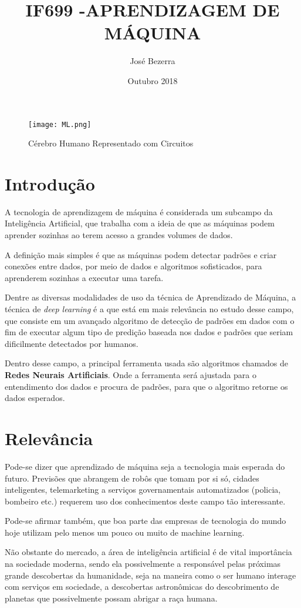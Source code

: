 \documentclass[10pt]{article}
\title{IF699 -APRENDIZAGEM DE MÁQUINA}
\author{José Bezerra}
\date{Outubro 2018}
\begin{document}
\maketitle

\begin{figure}[h!]
\centering
\texttt{[image: ML.png]}
\caption{Cérebro Humano Representado com Circuitos}
\label{fig:universe}
\end{figure}

\section{Introdução}
A tecnologia de aprendizagem de máquina é considerada um subcampo da Inteligência Artificial, que trabalha com a ideia de que as máquinas podem aprender sozinhas ao terem acesso a grandes volumes de dados.\citep{DI-UFPE}

A definição mais simples é que as máquinas podem detectar padrões e criar conexões entre dados, por meio de dados e algoritmos sofisticados, para aprenderem sozinhas a executar uma tarefa.\citep{NEWS}

Dentre as diversas modalidades de uso da técnica de Aprendizado de Máquina, a técnica de \textit{deep learning} é a que está em mais relevância no estudo desse campo, que consiste em um avançado algoritmo de detecção de padrões em dados com o fim de executar algum tipo de predição baseada nos dados e padrões que seriam dificilmente detectados por humanos.

Dentro desse campo, a principal ferramenta usada são algoritmos chamados de \textbf{Redes Neurais Artificiais}. Onde a ferramenta será ajustada para o entendimento dos dados e procura de padrões, para que o algoritmo retorne os dados esperados.

\section{Relevância}
Pode-se dizer que aprendizado de máquina seja a tecnologia mais esperada do futuro. Previsões que abrangem de robôs que tomam por si só, cidades inteligentes, telemarketing  a serviços governamentais automatizados (policia, bombeiro etc.) requerem uso dos conhecimentos deste campo tão interessante.

Pode-se afirmar também, que boa parte das empresas de tecnologia do mundo hoje utilizam pelo menos um pouco ou muito de machine learning. 

Não obstante do mercado, a área de inteligência artificial é de vital importância na sociedade moderna, sendo ela possivelmente a responsável pelas próximas grande descobertas da humanidade, seja na maneira como o ser humano interage com serviços em sociedade, a descobertas astronômicas do descobrimento de planetas que possivelmente possam abrigar a raça humana.
\citep{NASA}
\end{document}
